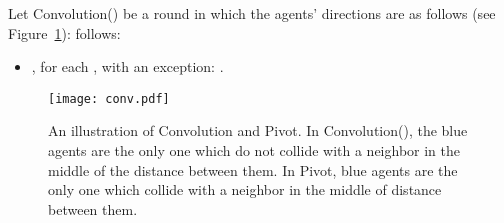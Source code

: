 Let Convolution() be a round in which the agents' directions are as 
\iffull
follows (see Figure~\ref{fig:red:strong}):
\else
follows:
\fi
\begin{itemize}
\item[]
,  for each , with an
exception: .
\end{itemize}
\iffull
\begin{figure}[H]
\begin{center}
\texttt{[image: conv.pdf]}
  \caption{An illustration of Convolution and Pivot. In Convolution(), the blue agents are the only one which do not collide with a neighbor in the middle of the distance between them. In Pivot, blue agents are the only one which collide with a neighbor in the middle of distance between them.}
\label{fig:red:strong}
\end{center}
\end{figure}
\else
\fi

